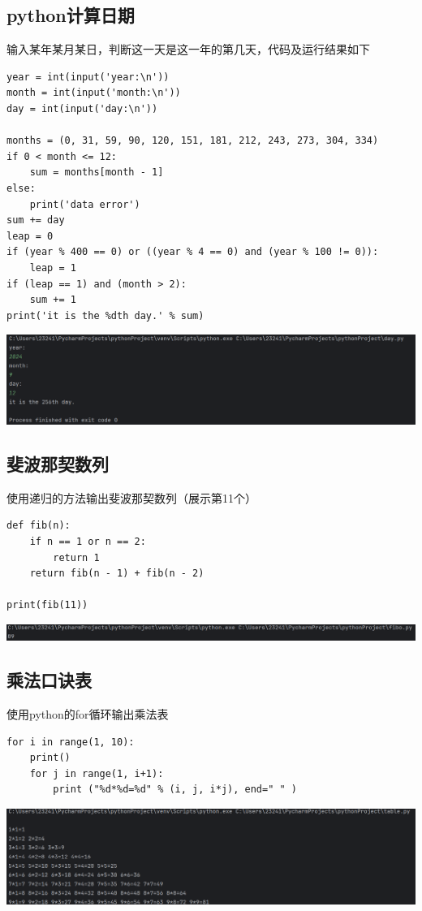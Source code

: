 \documentclass[UTF8,a4paper]{ctexart}
\begin{document}
\begin{sloppypar}
	\subsection{python计算日期}
	输入某年某月某日，判断这一天是这一年的第几天，代码及运行结果如下
	\begin{lstlisting}
year = int(input('year:\n'))
month = int(input('month:\n'))
day = int(input('day:\n'))

months = (0, 31, 59, 90, 120, 151, 181, 212, 243, 273, 304, 334)
if 0 < month <= 12:
    sum = months[month - 1]
else:
    print('data error')
sum += day
leap = 0
if (year % 400 == 0) or ((year % 4 == 0) and (year % 100 != 0)):
    leap = 1
if (leap == 1) and (month > 2):
    sum += 1
print('it is the %dth day.' % sum)
	\end{lstlisting}
	
	\includegraphics[width = 16cm]{5}
	
	\subsection{斐波那契数列}
	使用递归的方法输出斐波那契数列（展示第11个）
	\begin{lstlisting}
def fib(n):
    if n == 1 or n == 2:
        return 1
    return fib(n - 1) + fib(n - 2)

print(fib(11))
	\end{lstlisting}
	
	\includegraphics[width = 16cm]{6}
	
	\subsection{乘法口诀表}
	使用python的for循环输出乘法表
	\begin{lstlisting}
for i in range(1, 10):
    print()
    for j in range(1, i+1):
        print ("%d*%d=%d" % (i, j, i*j), end=" " )
	\end{lstlisting}
	
	\includegraphics[width = 16cm]{7}
	

\end{sloppypar}
\end{document}
